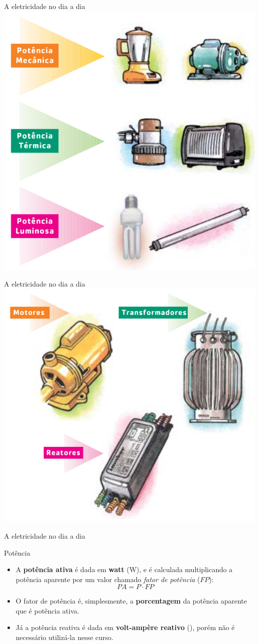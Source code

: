 \begin{frame}{A eletricidade no dia a dia}
	\centering
	\includegraphics[width=0.65\linewidth]{Figuras/Ch01/fig11}

\end{frame}


\begin{frame}{A eletricidade no dia a dia}
	\centering
	\includegraphics[width=0.7\linewidth]{Figuras/Ch01/fig12}

\end{frame}


\begin{frame}{A eletricidade no dia a dia}
	\begin{block}{Potência}
		\begin{itemize}
			\item A \textbf{potência ativa} é dada em \textbf{watt} (\si{\watt}), e é calculada multiplicando a potência aparente por um valor chamado \textit{fator de potência} ($ FP $):\[ PA=P\cdot FP \]
			\item O fator de potência é, simplesmente, a \textbf{porcentagem} da potência aparente que é potência ativa.
			\item Já a potência reativa é dada em \textbf{volt-ampère reativo} (\si{\var}), porém não é necessário utilizá-la nesse curso.
		\end{itemize}
	\end{block}
\end{frame}


